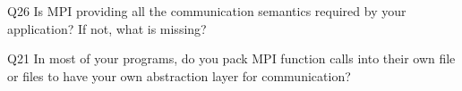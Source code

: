 \begin{description}%
\item{Q26} Is MPI providing all the communication semantics required by your application? If not, what is missing?%
\item{Q21} In most of your programs, do you pack MPI function calls into their own file or files to have your own abstraction layer for communication?%
\end{description}%
